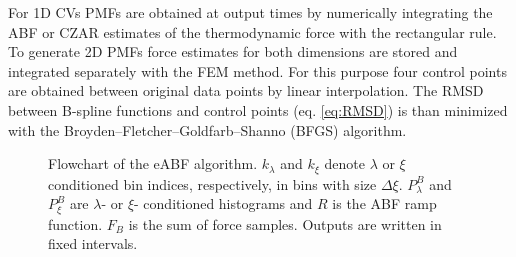 For 1D CVs PMFs are obtained at output times by numerically integrating the ABF or CZAR estimates of the thermodynamic force with the rectangular rule.\autocite{davis2007methods}
To generate 2D PMFs force estimates for both dimensions are stored and integrated separately with the FEM method.
For this purpose four control points are obtained between original data points by linear interpolation. The RMSD between B-spline functions and control points (eq. \ref{eq:RMSD}) is than minimized with the Broyden–Fletcher–Goldfarb–Shanno (BFGS) algorithm.\autocite{nocedal2006numerical}

\begin{figure}[H]
   \caption{
     Flowchart of the eABF algorithm. $k_{\lambda}$ and $k_\xi$ denote $\lambda$ or $\xi$ conditioned bin indices, respectively, in bins with size $\Delta\xi$. $P^B_\lambda$ and $P^B_\xi$ are $\lambda$- or $\xi$- conditioned histograms and $R$ is the ABF ramp function. $F_B$ is the sum of force samples. Outputs are written in fixed intervals.
   }

        \centering
\end{figure}
